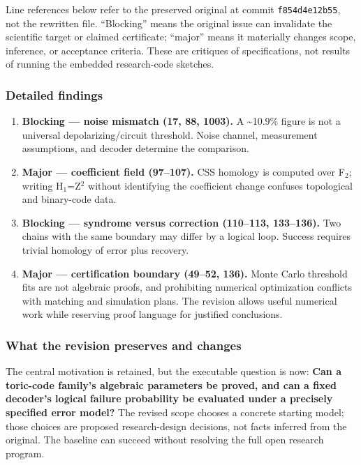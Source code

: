 \documentclass[
  11pt,
]{article}
\begin{document}
Line references below refer to the preserved original at commit
\texttt{f854d4e12b55}, not the rewritten file. ``Blocking'' means the
original issue can invalidate the scientific target or claimed
certificate; ``major'' means it materially changes scope, inference, or
acceptance criteria. These are critiques of specifications, not results
of running the embedded research-code sketches.

\subsubsection{Detailed findings}

\begin{enumerate}
\def\labelenumi{\arabic{enumi}.}
\item
  \textbf{Blocking --- noise mismatch (17, 88, 1003).} A
  \textasciitilde10.9\% figure is not a universal depolarizing/circuit
  threshold. Noise channel, measurement assumptions, and decoder
  determine the comparison.
\item
  \textbf{Major --- coefficient field (97--107).} CSS homology is
  computed over F\ensuremath{{}_{2}}; writing
  H\ensuremath{{}_{1}}=Z\ensuremath{{}^{2}} without identifying the
  coefficient change confuses topological and binary-code data.
\item
  \textbf{Blocking --- syndrome versus correction (110--113, 133--136).}
  Two chains with the same boundary may differ by a logical loop.
  Success requires trivial homology of error plus recovery.
\item
  \textbf{Major --- certification boundary (49--52, 136).} Monte Carlo
  threshold fits are not algebraic proofs, and prohibiting numerical
  optimization conflicts with matching and simulation plans. The
  revision allows useful numerical work while reserving proof language
  for justified conclusions.
\end{enumerate}

\subsubsection{What the revision preserves and changes}

The central motivation is retained, but the executable question is now:
\textbf{Can a toric-code family's algebraic parameters be proved, and
can a fixed decoder's logical failure probability be evaluated under a
precisely specified error model?} The revised scope chooses a concrete
starting model; those choices are proposed research-design decisions,
not facts inferred from the original. The baseline can succeed without
resolving the full open research program.
\end{document}

